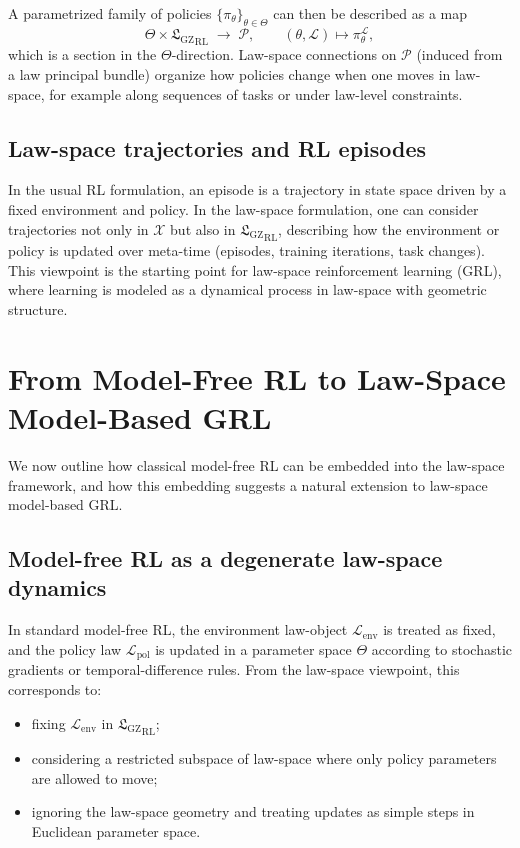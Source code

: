 \documentclass[11pt]{book}
\newcommand{\GZLS}{\ensuremath{\mathfrak{L}_{\mathrm{GZ}}}}
\theoremstyle{plain}
\theoremstyle{definition}
\theoremstyle{remark}
\begin{document}
A parametrized family of policies
$\{\pi_\theta\}_{\theta\in\Theta}$ can then be described as a map
\[
   \Theta \times {\GZLS}_{\mathrm{RL}}
   \;\longrightarrow\; \mathcal{P},
   \qquad
   (\theta,\mathcal{L}) \longmapsto \pi_\theta^{\mathcal{L}},
\]
which is a section in the $\Theta$-direction. Law-space connections
on $\mathcal{P}$ (induced from a law principal bundle) organize how
policies change when one moves in law-space, for example along
sequences of tasks or under law-level constraints.

\subsection*{Law-space trajectories and RL episodes}

In the usual RL formulation, an episode is a trajectory in state
space driven by a fixed environment and policy. In the law-space
formulation, one can consider trajectories not only in $\mathcal{X}$
but also in ${\GZLS}_{\mathrm{RL}}$, describing how the environment or
policy is updated over meta-time (episodes, training iterations,
task changes). This viewpoint is the starting point for law-space
reinforcement learning (GRL), where learning is modeled as a
dynamical process in law-space with geometric structure.

\section{From Model-Free RL to Law-Space Model-Based GRL}
\label{sec:from-model-free-to-grl}


We now outline how classical model-free RL can be embedded into the
law-space framework, and how this embedding suggests a natural
extension to law-space model-based GRL.

\subsection*{Model-free RL as a degenerate law-space dynamics}

In standard model-free RL, the environment law-object
$\mathcal{L}_{\mathrm{env}}$ is treated as fixed, and the policy law
$\mathcal{L}_{\mathrm{pol}}$ is updated in a parameter space
$\Theta$ according to stochastic gradients or temporal-difference
rules. From the law-space viewpoint, this corresponds to:
\begin{itemize}
  \item fixing $\mathcal{L}_{\mathrm{env}}$ in ${\GZLS}_{\mathrm{RL}}$;
  \item considering a restricted subspace of law-space where only
        policy parameters are allowed to move;
  \item ignoring the law-space geometry and treating updates as
        simple steps in Euclidean parameter space.
\end{itemize}
\end{document}
